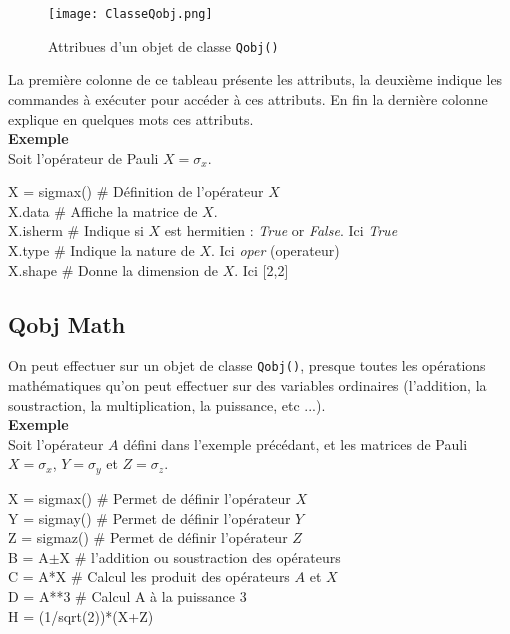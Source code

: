 \begin{figure}[!h]
\begin{center}
\texttt{[image: ClasseQobj.png]}
\end{center}
\caption{Attribues d'un objet de classe \texttt{Qobj()}}
\label{qobj}
\end{figure}

La première colonne de ce tableau présente les attributs, la deuxième indique 
les commandes à exécuter pour accéder à ces attributs. En fin la dernière 
colonne explique en quelques mots ces attributs.\\
\textbf{Exemple}\\
Soit l'opérateur de Pauli $X=\sigma_x$.\\
\begin{tt}
X = sigmax() \# Définition de l'opérateur $X$\\
X.data \# Affiche la matrice de $X$.\\
X.isherm \# Indique si $X$ est hermitien : \emph{True} or \emph{False}. Ici 
\emph{True}\\
X.type \# Indique la nature de $X$. Ici \emph{oper} (operateur)\\
X.shape \# Donne la dimension de $X$. Ici [2,2]\\
\end{tt}

\subsection{Qobj Math}

On peut effectuer sur un objet de classe \texttt{Qobj()}, presque toutes les 
opérations mathématiques qu'on peut effectuer sur des variables ordinaires 
(l'addition, la soustraction, la multiplication, la puissance, etc ...).\\
\textbf{Exemple}\\
Soit l'opérateur $A$ défini dans l'exemple précédant, et les matrices de Pauli 
$X = \sigma_x$, $Y=\sigma_y$ et $Z = \sigma_z$.\\
\begin{tt}
X = sigmax() \# Permet de définir l'opérateur $X$\\
Y = sigmay() \# Permet de définir l'opérateur $Y$\\
Z = sigmaz() \# Permet de définir l'opérateur $Z$\\
B = A$\pm$X \# l'addition ou soustraction des opérateurs\\
C = A*X \# Calcul les produit des opérateurs $A$ et $X$\\
D = A**3 \# Calcul A à la puissance 3\\
H = (1/sqrt(2))*(X+Z) \\
\end{tt}

